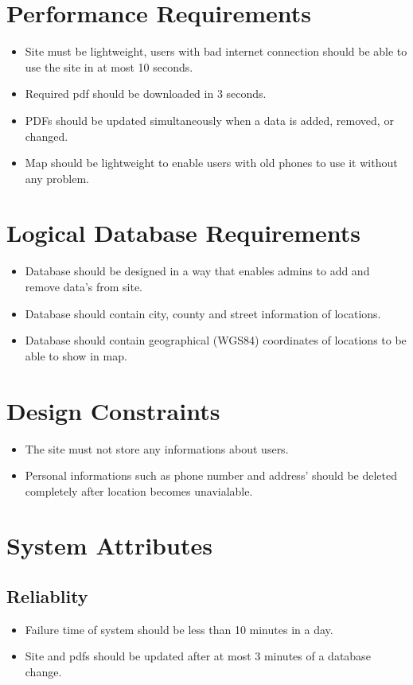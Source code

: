 \section{Performance Requirements}
\begin{itemize}
    \item Site must be lightweight, users with bad internet connection should be able to use the site in at most 10 seconds.
    \item Required pdf should be downloaded in 3 seconds.
    \item PDFs should be updated simultaneously when a data is added, removed, or changed.
    \item Map should be lightweight to enable users with old phones to use it without any problem.
\end{itemize}

\section{Logical Database Requirements}
\begin{itemize}
    \item Database should be designed in a way that enables admins to add and remove data's from site.
    \item Database should contain city, county and street information of locations.
    \item Database should contain geographical (WGS84) coordinates of locations to be able to show in map.
\end{itemize}

\section{Design Constraints}
\begin{itemize}
    \item The site must not store any informations about users.
    \item Personal informations such as phone number and address' should be deleted completely after location becomes unavialable.
\end{itemize}

\section{System Attributes}
\subsection{Reliablity}
\begin{itemize}
    \item Failure time of system should be less than 10 minutes in a day.
    \item Site and pdfs should be updated after at most 3 minutes of a database change.
\end{itemize}

